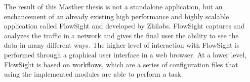 
The result of this Masther thesis is not a standalone application, but an enchancement of an already existing high performance and highly scalable application called FlowSight and developed by Zhilabs.
FlowSight captures and analyzes the traffic in a network and gives the final user the ability to see the data in many different ways. The higher level of interaction with FlowSight is performed through
a graphical user interface in a web browser. At a lower level, FlowSight is based on workflows, which are a series of configuration files that using the implemented modules are able to perform a task.


